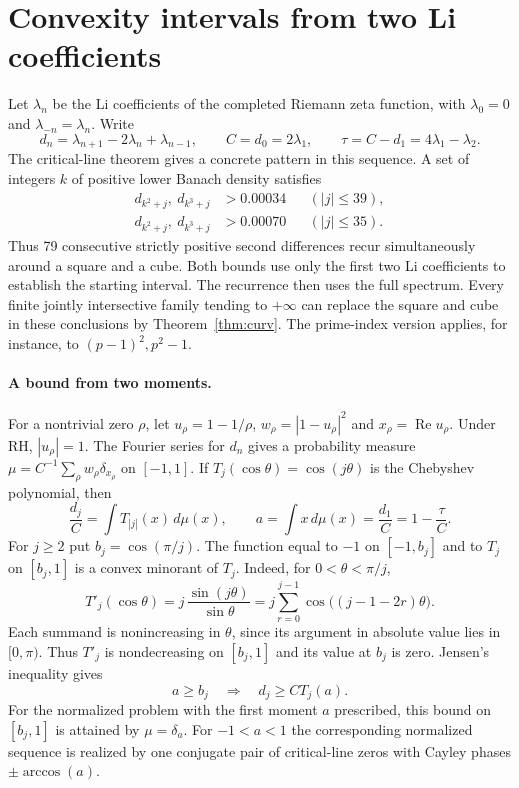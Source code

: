 \section{Convexity intervals from two Li coefficients}
\label{sec:windows}

Let $\lambda_n$ be the Li coefficients of the completed Riemann zeta
function, with $\lambda_0=0$ and $\lambda_{-n}=\lambda_n$. Write
\[
 d_n=\lambda_{n+1}-2\lambda_n+\lambda_{n-1},\qquad
 C=d_0=2\lambda_1,\qquad \tau=C-d_1=4\lambda_1-\lambda_2 .
\]
The critical-line theorem gives a concrete pattern in this sequence.
A set of integers $k$ of positive lower Banach density satisfies
\begin{align}
 d_{k^2+j},\ d_{k^3+j}&>0.00034 && (|j|\le39),\label{eq:79window}\\
 d_{k^2+j},\ d_{k^3+j}&>0.00070 && (|j|\le35).\label{eq:71window}
\end{align}
Thus 79 consecutive strictly positive second differences recur
simultaneously around a square and a cube. Both bounds use only the
first two Li coefficients to establish the starting interval. The
recurrence then uses the full spectrum. Every finite jointly
intersective family tending to $+\infty$ can replace the square and
cube in these conclusions by Theorem~\ref{thm:curv}. The prime-index version applies, for instance, to \((p-1)^2,p^2-1\).

\paragraph{A bound from two moments.}
For a nontrivial zero $\rho$, let $u_\rho=1-1/\rho$,
$w_\rho=|1-u_\rho|^2$ and $x_\rho=\operatorname{Re}u_\rho$.
Under RH, $|u_\rho|=1$. The Fourier series for $d_n$ gives a
probability measure $\mu=C^{-1}\sum_\rho w_\rho\delta_{x_\rho}$ on
$[-1,1]$. If $T_j(\cos\theta)=\cos(j\theta)$ is the Chebyshev
polynomial, then
\[
 \frac{d_j}{C}=\int T_{|j|}(x)\,d\mu(x),\qquad
 a=\int x\,d\mu(x)=\frac{d_1}{C}=1-\frac{\tau}{C}.
\]
For $j\ge2$ put $b_j=\cos(\pi/j)$. The function equal to $-1$ on
$[-1,b_j]$ and to $T_j$ on $[b_j,1]$ is a convex minorant of $T_j$.
Indeed, for $0<\theta<\pi/j$,
\[
 T'_j(\cos\theta)
   =j\,\frac{\sin(j\theta)}{\sin\theta}
   =j\sum_{r=0}^{j-1}\cos\big((j-1-2r)\theta\big).
\]
Each summand is nonincreasing in $\theta$, since its argument in
absolute value lies in $[0,\pi)$. Thus $T'_j$ is nondecreasing on
$[b_j,1]$ and its value at $b_j$ is zero. Jensen's inequality gives
\[
 a\ge b_j\quad\Longrightarrow\quad d_j\ge C T_j(a).
\]
For the normalized problem with the first moment $a$ prescribed, this
bound on $[b_j,1]$ is attained by $\mu=\delta_a$. For
$-1<a<1$ the corresponding normalized sequence is realized by one
conjugate pair of critical-line zeros with Cayley phases
$\pm\arccos(a)$.

